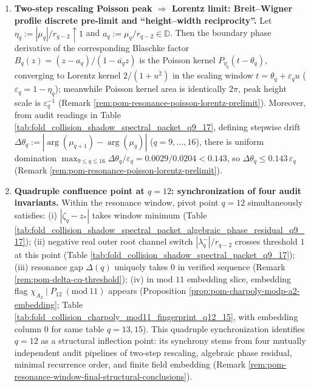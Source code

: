 \begin{enumerate}
  \item \textbf{Two-step rescaling Poisson peak \texorpdfstring{$\Rightarrow$}{=>} Lorentz limit: Breit--Wigner profile discrete pre-limit and ``height--width reciprocity''.}
  Let \(\eta_q:=|\mu_q|/r_{q-2}\uparrow 1\) and \(a_q:=\mu_q/r_{q-2}\in\mathbb{D}\).
  Then the boundary phase derivative of the corresponding Blaschke factor \(B_q(z)=(z-a_q)/(1-\overline{a_q}z)\) is the Poisson kernel \(P_{\eta_q}(t-\theta_q)\), converging to Lorentz kernel \(2/(1+u^2)\) in the scaling window \(t=\theta_q+\varepsilon_q u\) (\(\varepsilon_q=1-\eta_q\));
  meanwhile Poisson kernel area is identically \(2\pi\), peak height scale is \(\varepsilon_q^{-1}\) (Remark \ref{rem:pom-resonance-poisson-lorentz-prelimit}).
  Moreover, from audit readings in Table \ref{tab:fold_collision_shadow_spectral_packet_q9_17}, defining stepwise drift
  \(
  \Delta\theta_q:=|\arg(\mu_{q+1})-\arg(\mu_q)|
  \)
  (\(q=9,\dots,16\)), there is uniform domination
  \(
  \max_{9\le q\le 16}\Delta\theta_q/\varepsilon_q
  =0.0029/0.0204<0.143
  \), so \(\Delta\theta_q\le 0.143\,\varepsilon_q\) (Remark \ref{rem:pom-resonance-poisson-lorentz-prelimit}).

  \item \textbf{Quadruple confluence point at \texorpdfstring{$q=12$}{q=12}: synchronization of four audit invariants.}
  Within the resonance window, pivot point \(q=12\) simultaneously satisfies: (i) \(|\zeta_q-z_\ast|\) takes window minimum (Table \ref{tab:fold_collision_shadow_spectral_packet_algebraic_phase_residual_q9_17}); (ii) negative real outer root channel switch \(|\lambda_q^-|/r_{q-2}\) crosses threshold \(1\) at this point (Table \ref{tab:fold_collision_shadow_spectral_packet_q9_17}); (iii) resonance gap \(\Delta(q)\) uniquely takes \(0\) in verified sequence (Remark \ref{rem:pom-delta-cq-threshold}); (iv) in mod \(11\) embedding slice, embedding flag \(\chi_{A_2}\mid P_{12}\ (\mathrm{mod}\ 11)\) appears (Proposition \ref{prop:pom-charpoly-modp-a2-embedding}; Table \ref{tab:fold_collision_charpoly_mod11_fingerprint_q12_15}, with embedding column \(0\) for same table \(q=13,15\)).
  This quadruple synchronization identifies \(q=12\) as a structural inflection point: its synchrony stems from four mutually independent audit pipelines of two-step rescaling, algebraic phase residual, minimal recurrence order, and finite field embedding (Remark \ref{rem:pom-resonance-window-final-structural-conclusions}).


\end{enumerate}
